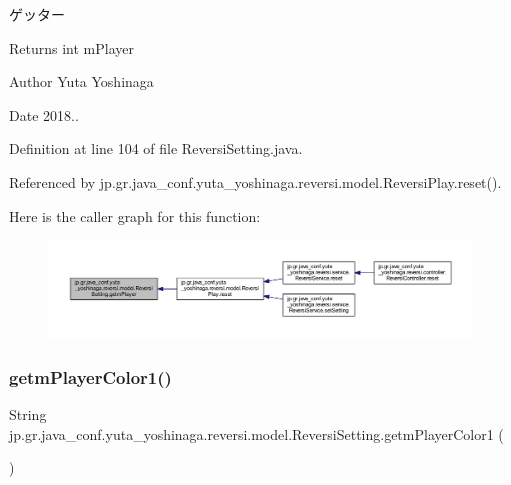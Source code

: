 ゲッター 

\begin{DoxyReturn}{Returns}
int m\+Player 
\end{DoxyReturn}
\begin{DoxyAuthor}{Author}
Yuta Yoshinaga 
\end{DoxyAuthor}
\begin{DoxyDate}{Date}
2018.. 
\end{DoxyDate}


Definition at line 104 of file Reversi\+Setting.\+java.



Referenced by jp.\+gr.\+java\+\_\+conf.\+yuta\+\_\+yoshinaga.\+reversi.\+model.\+Reversi\+Play.\+reset().

Here is the caller graph for this function\+:
\nopagebreak
\begin{figure}[H]
\begin{center}
\leavevmode
\includegraphics[width=350pt]{classjp_1_1gr_1_1java__conf_1_1yuta__yoshinaga_1_1reversi_1_1model_1_1_reversi_setting_ad6a3e06364081f7f81d88e0f2e35d45c_icgraph}
\end{center}
\end{figure}
\mbox{\label{classjp_1_1gr_1_1java__conf_1_1yuta__yoshinaga_1_1reversi_1_1model_1_1_reversi_setting_a72a40c1c07aae2f448d3cc9fba274a5a}} 
\subsubsection{\texorpdfstring{getm\+Player\+Color1()}{getmPlayerColor1()}}
{\footnotesize\ttfamily String jp.\+gr.\+java\+\_\+conf.\+yuta\+\_\+yoshinaga.\+reversi.\+model.\+Reversi\+Setting.\+getm\+Player\+Color1 (\begin{DoxyParamCaption}{ }\end{DoxyParamCaption})}



